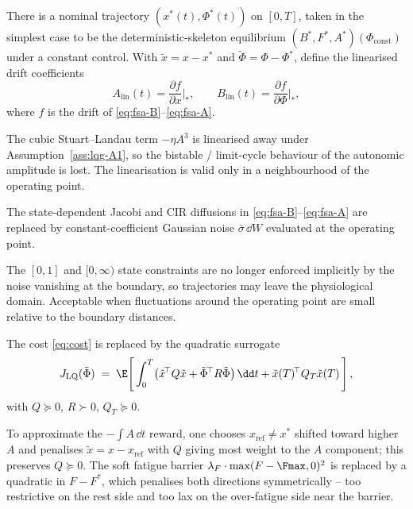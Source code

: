 \begin{assumption}\label{ass:lqg-A1}
There is a nominal trajectory $(x^*(t),\Phi^*(t))$ on $[0,T]$, taken in
the simplest case to be the deterministic-skeleton equilibrium
$(B^*,F^*,A^*)(\Phi_{\mathrm{const}})$ under a constant control. With
$\tilde x = x - x^*$ and $\tilde \Phi = \Phi - \Phi^*$, define the
linearised drift coefficients
\begin{equation}
  A_{\mathrm{lin}}(t) = \frac{\partial f}{\partial x}\bigg|_{*},
  \qquad B_{\mathrm{lin}}(t) = \frac{\partial f}{\partial \Phi}\bigg|_{*},
  \label{eq:lqg-AB}
\end{equation}
where $f$ is the drift of \eqref{eq:fsa-B}--\eqref{eq:fsa-A}.
\end{assumption}

The cubic Stuart--Landau term $-\eta A^3$ is linearised away under
Assumption~\ref{ass:lqg-A1}, so the bistable / limit-cycle behaviour of
the autonomic amplitude is lost. The linearisation is valid only in a
neighbourhood of the operating point.

\begin{assumption}\label{ass:lqg-A2}
The state-dependent Jacobi and CIR diffusions in
\eqref{eq:fsa-B}--\eqref{eq:fsa-A} are replaced by constant-coefficient
Gaussian noise $\bar\sigma\,\dd W$ evaluated at the operating point.
\end{assumption}

The $[0,1]$ and $[0,\infty)$ state constraints are no longer enforced
implicitly by the noise vanishing at the boundary, so trajectories may
leave the physiological domain. Acceptable when fluctuations around the
operating point are small relative to the boundary distances.

\begin{assumption}\label{ass:lqg-A3}
The cost \eqref{eq:cost} is replaced by the quadratic surrogate
\begin{equation}
  J_{\mathrm{LQ}}(\tilde \Phi)
    \;=\; \E\!\left[\,\int_0^T \bigl(\tilde x^{\!\top} Q \tilde x
                       + \tilde \Phi^{\!\top} R \tilde \Phi\bigr)\,\dd t
                       + \tilde x(T)^{\!\top} Q_T \tilde x(T)\,\right],
  \label{eq:lqg-cost}
\end{equation}
with $Q \succeq 0$, $R \succ 0$, $Q_T \succeq 0$.
\end{assumption}

To approximate the $-\!\int A\,\dd t$ reward, one chooses
$x_{\mathrm{ref}} \neq x^*$ shifted toward higher $A$ and penalises
$\tilde x = x - x_{\mathrm{ref}}$ with $Q$ giving most weight to the $A$
component; this preserves $Q \succeq 0$. The soft fatigue barrier
$\lambda_F \cdot \max(F-\Fmax,0)^2$ is replaced by a quadratic in
$F-F^*$, which penalises both directions symmetrically -- too restrictive
on the rest side and too lax on the over-fatigue side near the barrier.

